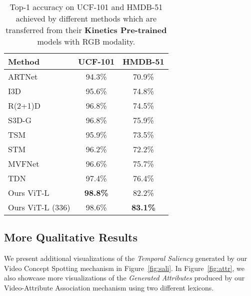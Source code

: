 \documentclass[10pt,twocolumn,letterpaper]{article}
\begin{document}
\begin{table}[h]
\centering
\begin{tabular}{lcc}
\toprule
\textbf{Method}   & \textbf{UCF-101}  & \textbf{HMDB-51} \\ \midrule

ARTNet~\cite{ARN}  & 94.3\% & 70.9\% \\  
I3D~\cite{i3d}    & 95.6\%  & 74.8\% \\ 
R(2+1)D~\cite{r2+1d}    & 96.8\%  & 74.5\% \\
S3D-G~\cite{s3d} &  96.8\%  & 75.9\% \\ 
TSM~\cite{tsm} &  95.9\%  & 73.5\%  \\
STM~\cite{stm}  &  96.2\%  & 72.2\%   \\ 
MVFNet~\cite{wu2020MVFNet}  &  96.6\%  & 75.7\%  \\ 
TDN~\cite{tdn} & 97.4\% & 76.4\% \\ \midrule
Ours ViT-L  & \textbf{98.8\%} & 82.2\% \\
Ours ViT-L (336) & 98.6\% & \textbf{83.1\%} \\
\bottomrule
\end{tabular}
\caption{Top-1 accuracy on UCF-101 and HMDB-51 achieved by different methods which are transferred from their \textbf{Kinetics Pre-trained} models with RGB modality.}
\label{t:UCFHMDB}
\end{table}
















\begin{figure*}
\centering
{}
\hfill
{}
\vspace{-0.5em}
\caption{Visualization of the attribute sentence generated by the \textbf{Video-Attribute Association} mechanism that corrected the original {\color{red}incorrect} prediction to the {\color{green}correct} one.}
\label{fig:attr}
\end{figure*}









\subsection{More Qualitative Results}\label{sec:vis}
We present additional visualizations of the \emph{Temporal Saliency} generated by our Video Concept Spotting mechanism in Figure~\ref{fig:sali}. In Figure~\ref{fig:attr}, we also showcase more visualizations of the \emph{Generated Attributes} produced by our Video-Attribute Association mechanism using two different lexicons.

 
\end{document}
